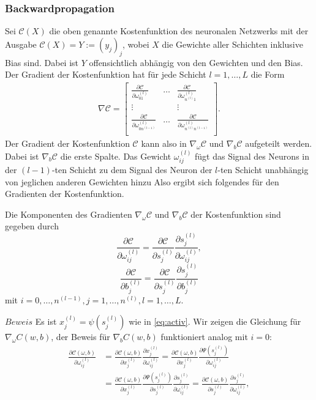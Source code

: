\subsubsection{Backwardpropagation}
Sei $\mathcal{C}(X)$ die oben genannte Kostenfunktion des neuronalen Netzwerks mit der Ausgabe
$\mathcal{C}(X)=Y:=(y_j)_j$, wobei $X$ die Gewichte aller Schichten inklusive Bias sind. Dabei ist $Y$
offensichtlich abhängig von den Gewichten und den Bias. Der Gradient der Kostenfunktion hat für jede Schicht
$l = 1, \dots, L$ die Form
\begin{align*}
    \nabla\mathcal{C}=
        \begin{bmatrix}
            \frac{\partial \mathcal{C}}{\partial \omega_{01}^{(l)}} & \dots &
            \frac{\partial \mathcal{C}}{\partial \omega_{n^{(l)}1}^{(l)}} \\
            \vdots & & \vdots \\
            \frac{\partial \mathcal{C}}{\partial \omega_{0n^{(l-1)}}^{(l)}} & \dots &
            \frac{\partial \mathcal{C}}{\partial \omega_{n^{(l)}n^{(l-1)}}^{(l)}} \\
        \end{bmatrix}.
\end{align*}
Der Gradient der Kostenfunktion $\mathcal{C}$ kann also in $\nabla_{\omega}\mathcal{C}$ und $\nabla_{b}\mathcal{C}$ aufgeteilt werden.
Dabei ist $\nabla_{b}\mathcal{C}$ die erste Spalte. Das Gewicht $\omega_{ij}^{(l)}$ fügt das Signal des Neurons in der
$(l-1)$-ten Schicht zu dem Signal des Neuron der $l$-ten Schicht unabhängig von jeglichen anderen Gewichten hinzu
Also ergibt sich folgendes für den Gradienten der Kostenfunktion.
\begin{satz}
    \label{machine-cost-grad}
    Die Komponenten des Gradienten $\nabla_{\omega}\mathcal{C}$ und $\nabla_{b}\mathcal{C}$ der Kostenfunktion sind
    gegeben durch
    \[
        \frac{\partial \mathcal{C}}{\partial \omega_{ij}^{(l)}} = \frac{\partial \mathcal{C}}{\partial s_{j}^{(l)}} \frac{\partial s_{j}^{(l)}}{\partial \omega_{ij}^{(l)}},
    \]
    \[
        \frac{\partial \mathcal{C}}{\partial b_{j}^{(l)}} = \frac{\partial \mathcal{C}}{\partial s_{j}^{(l)}} \frac{\partial s_{j}^{(l)}}{\partial b_j^{(l)}}
    \]
    mit $i = 0, \dots, n^{(l-1)}, j= 1, \dots,  n^{(l)}, l=1, \dots, L$.
\end{satz}
$Beweis$ Es ist $x_j^{(l)}=\psi(s_j^{(l)})$ wie in \eqref{eq:activ}. Wir zeigen die Gleichung für
$\nabla_{\omega}C(w,b)$, der Beweis für  $\nabla_{b}C(w,b)$ funktioniert analog mit $i=0$:
\begin{align*}
    \frac{\partial \mathcal{C}(\omega,b)}{\partial \omega_{ij}^{(l)}} &= \frac{\partial \mathcal{C}(\omega,b)}{\partial x_j^{(l)}} \frac{\partial x_j^{(l)}}{\partial \omega_{ij}^{(l)}}
    = \frac{\partial \mathcal{C}(\omega,b)}{\partial x_j^{(l)}} \frac{\partial \Psi(s_j^{(l)})}{\partial \omega_{ij}^{(l)}} \\
    &=\frac{\partial \mathcal{C}(\omega,b)}{\partial x_j^{(l)}} \frac{\partial \Psi(s_j^{(l)})}{\partial s_j^{(l)}} \frac{\partial s_j^{(l)}}{\partial \omega_{ij}^{(l)}}
    = \frac{\partial \mathcal{C}(\omega,b)}{\partial s_{j}^{(l)}} \frac{\partial s_{j}^{(l)}}{\partial \omega_{ij}^{(l)}}, \\
\end{align*}
